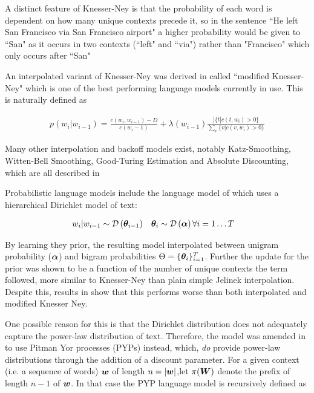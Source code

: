 A distinct feature of Knesser-Ney is that the probability of each word is dependent on how many unique contexts precede it, so in the sentence ``He left San Francisco via San Francisco airport" a higher probability would be given to ``San" as it occurs in two contexts (``left" and ``via") rather than "Francisco" which only occurs after ``San"

An interpolated variant of Knesser-Ney was derived in\cite{Goodman2001} called ``modified Knesser-Ney" which is one of the best performing language models currently in use. This is naturally defined as

\begin{align}
p(w_i | w_{i-1}) = \frac{c(w_i, w_{i-1}) - D}{c(w_i-1)} + \lambda(w_{i-1})\frac{ | \{t | c(t, w_i) > 0\} }{\sum_v \{v | c(v, w_i) > 0\}}
\end{align}

Many other interpolation and backoff models exist, notably Katz-Smoothing, Witten-Bell Smoothing, Good-Turing Estimation and Absolute Discounting, which are all described in \cite{Goodman2001}

Probabilistic language models include the language model of \cite{MacKay1995} which uses a hierarchical Dirichlet model of text:

\begin{align}
w_i|w_{i-1} & \sim \mathcal{D} \left( {\bm \theta_{i-1}} \right) & \bm \theta_i & \sim \mathcal{D} \left( {\bm \alpha} \right) \forall i = 1\ldots T
\end{align}

By learning they prior, the resulting model interpolated between unigram probability ($\bm \alpha$) and bigram probabilities $\Theta = \{ \bm \theta_i \}_{i=1}^{T}$. Further the update for the prior was shown to be a function of the number of unique contexts the term followed, more similar to Knesser-Ney than plain simple Jelinek interpolation. Despite this, results in \cite{Teh} show that this performs worse than both interpolated and modified Knesser Ney.

One possible reason for this is that the Dirichlet distribution does not adequately capture the power-law distribution of text. Therefore, the model was amended in \cite{Teh} to use Pitman Yor processes (PYPs) instead, which, \emph{do} provide power-law distributions through the addition of a discount parameter. For a given context (i.e. a sequence of words) $\bm w$ of length $n = |\bm w|$,let $\pi(\bm W)$ denote the prefix of length $n-1$ of $\bm w$. In that case the PYP language model is recursively defined as

